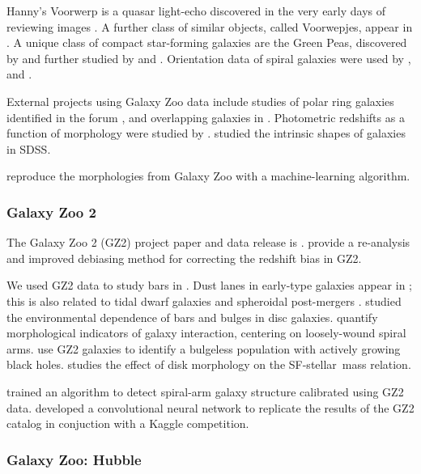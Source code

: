 \documentclass[twocolumn]{aastex6}
\begin{document}
Hanny's Voorwerp is a quasar light-echo discovered in the very early days of reviewing images \citep{lin09,joz09,ram10,sch10,kee12}. A further class of similar objects, called Voorwepjes, appear in \citet{kee12b,kee15}. A unique class of compact star-forming galaxies are the Green Peas, discovered by \citep{car09} and further studied by \citet{amo10,cha12} and \citet{haw12}. Orientation data of spiral galaxies were used by \citet{lan08}, \citet{slo09} and \citet{jim10}. 

External projects using Galaxy Zoo data include studies of polar ring galaxies identified in the forum \citep{fin12}, and overlapping galaxies in \citet{kee13,kee14}. Photometric redshifts as a function of morphology were studied by \citet{way11}. \citet{rod13} studied the intrinsic shapes of galaxies in SDSS.

\citet{ban10} reproduce the morphologies from Galaxy Zoo with a machine-learning algorithm. 

\subsubsection{Galaxy Zoo 2}

The Galaxy Zoo 2 (GZ2) project paper and data release is \citet{wil13}. \citet{har16} provide a re-analysis and improved debiasing method for correcting the redshift bias in GZ2.

We used GZ2 data to study bars in \citet{hoy11,mas11c,mas12a,che13,gal15}. Dust lanes in early-type galaxies appear in \citet{kav12a,sha12b}; this is also related to tidal dwarf galaxies \citep{kav12} and spheroidal post-mergers \citep{car12,kav13a}. \citet{ski12} studied the environmental dependence of bars and bulges in disc galaxies. \citet{cas13} quantify morphological indicators of galaxy interaction, centering on loosely-wound spiral arms. \citet{sim13} use GZ2 galaxies to identify a bulgeless population with actively growing black holes. \citet{wil15} studies the effect of disk morphology on the SF-stellar~mass relation.

\citet{dav12a,dav14} trained an algorithm to detect spiral-arm galaxy structure calibrated using GZ2 data. \citet{die15} developed a convolutional neural network to replicate the results of the GZ2 catalog in conjuction with a Kaggle competition.

\subsubsection{Galaxy Zoo: Hubble}
\end{document}
